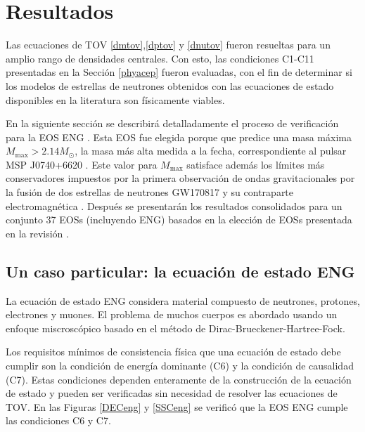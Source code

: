 \chapter{Resultados}

\noindent Las ecuaciones de TOV \eqref{dmtov},\eqref{dptov} y \eqref{dnutov} fueron resueltas para un amplio rango de densidades centrales. Con esto, las condiciones C1-C11 presentadas en la Sección \ref{phyacep} fueron evaluadas, con el fin de determinar si los modelos de estrellas de neutrones obtenidos con las ecuaciones de estado disponibles en la literatura son físicamente viables.



En la siguiente sección se describirá detalladamente el proceso de verificación para la EOS ENG \cite{Engvik1994}. Esta EOS fue elegida porque que predice una masa máxima $M_{\text{max}}>2.14M_{\odot}$, la masa más alta medida a la fecha, correspondiente al pulsar MSP J0740+6620 \cite{Cromartie2019}. Este valor para $M_{\text{max}}$ satisface además los límites más conservadores impuestos por la primera observación de ondas gravitacionales por la fusión de dos estrellas de neutrones GW170817 y su contraparte electromagnética \cite{Rezzolla2017,Radice2018,Ruiz2018,Shibata2019}. Después se presentarán los resultados consolidados para un conjunto 37 EOSs (incluyendo ENG) basados en la elección de EOSs presentada en la revisión \cite{Ozel2016}.

\section{Un caso particular: la ecuación de estado ENG}

\noindent La ecuación de estado ENG considera material compuesto de neutrones, protones, electrones y muones. El problema de muchos cuerpos es abordado usando un enfoque miscroscópico basado en el método de Dirac-Brueckener-Hartree-Fock.  

Los requisitos mínimos de consistencia física que una ecuación de estado debe cumplir son la condición de energía dominante (C6) y la condición de causalidad (C7). Estas condiciones dependen enteramente de la construcción de la ecuación de estado y pueden ser verificadas sin necesidad de resolver las ecuaciones de TOV. En las Figuras \ref{DECeng} y \ref{SSCeng} se verificó que la EOS ENG cumple las condiciones C6 y C7.

